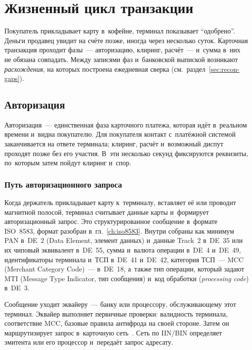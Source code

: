 
\chapter{Жизненный цикл транзакции}\label{ch:tx-lifecycle}
Покупатель прикладывает карту в~кофейне, терминал показывает
\enquote{одобрено}. Деньги продавец увидит на счёте позже, иногда через
несколько суток. Карточная транзакция проходит фазы~--- авторизацию,
клиринг, расчёт~--- и~сумма в~них не обязана совпадать. Между записями фаз
и~банковской выпиской возникают \emph{расхождения}, на которых построена ежедневная сверка
(см.~раздел~\ref{sec:recon-gaps}).

\section{Авторизация}\label{sec:tx-authorization}

Авторизация~--- единственная фаза карточного платежа, которая идёт в~реальном
времени и~видна покупателю. Для покупателя контакт с~платёжной системой
заканчивается на ответе терминала; клиринг, расчёт и~возможный диспут проходят
позже без его участия. В~эти несколько секунд фиксируются реквизиты, по~которым
затем пойдут клиринг и~спор.

\subsection*{Путь авторизационного запроса}

Когда держатель прикладывает карту к~терминалу, вставляет её или проводит
магнитной полосой, терминал считывает данные карты и~формирует авторизационный
запрос. Это структурированное сообщение в~формате ISO~8583, формат разобран
в~гл.~\ref{ch:iso8583}. Внутри собраны как минимум PAN в~DE~2 (Data
Element, элемент данных) и~данные Track~2 в~DE~35 или их чиповый эквивалент
в~DE~55, сумма и~валюта операции в~DE~4 и~DE~49, идентификаторы терминала и~ТСП
в~DE~41 и~DE~42, категория ТСП~--- MCC (Merchant Category Code)~--- в~DE~18,
а~также тип операции, который задают MTI (Message Type Indicator, тип
сообщения) и~код обработки (\textit{processing code}) в~DE~3.

Сообщение уходит эквайеру~--- банку или процессору, обслуживающему этот
терминал. Эквайер выполняет первичные проверки: валидность терминала,
соответствие MCC, базовые правила антифрода на своей стороне. Затем он
маршрутизирует запрос в~карточную сеть~\cite{visa-core-rules}. Сеть по IIN/BIN
определяет эмитента или его процессор и~передаёт запрос адресату.

